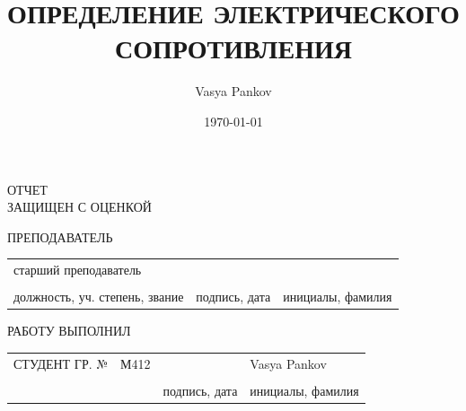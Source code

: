 \documentclass[14pt]{extarticle}
\author{Vasya Pankov}
\date{\today}
\title{ОПРЕДЕЛЕНИЕ ЭЛЕКТРИЧЕСКОГО СОПРОТИВЛЕНИЯ}
\begin{document}
\begin{small}
\begin{titlepage}

\linespread{1}\selectfont{}

\vspace{32pt}


\vspace{60pt}

\raggedright{ОТЧЕТ \\
ЗАЩИЩЕН С ОЦЕНКОЙ}
\vspace{14pt}

\raggedright{ПРЕПОДАВАТЕЛЬ}

\vspace{12pt}

\begin{tabularx}{\textwidth}{ >{\centering\arraybackslash}X >{\centering\arraybackslash}X >{\centering\arraybackslash}X }
	 старший преподаватель & &  \\ 
	 \hrulefill & \hrulefill & \hrulefill \\ 
\footnotesize{должность, уч. степень, звание} & \footnotesize{подпись, дата} & \footnotesize{инициалы, фамилия} \\ 
\end{tabularx} 
 
\vspace{48pt} 


\vspace{40pt} 


\vspace{40pt} 


\vspace*{\fill} 

\raggedright{РАБОТУ ВЫПОЛНИЛ} 

\vspace{10pt} 

\begin{tabularx}{\textwidth}{>{\raggedright\arraybackslash}X  >{\centering\arraybackslash}X >{\centering\arraybackslash}X >{\centering\arraybackslash}X }
СТУДЕНТ ГР. № & М412 & & Vasya Pankov \\ 
	 & \hrulefill & \hrulefill & \hrulefill \\ 
	 &  & \footnotesize{подпись, дата} & \footnotesize{инициалы, фамилия} \\ 
\end{tabularx} 
 
\vspace*{\fill} 


\end{titlepage}
\end{small}
\end{document}
